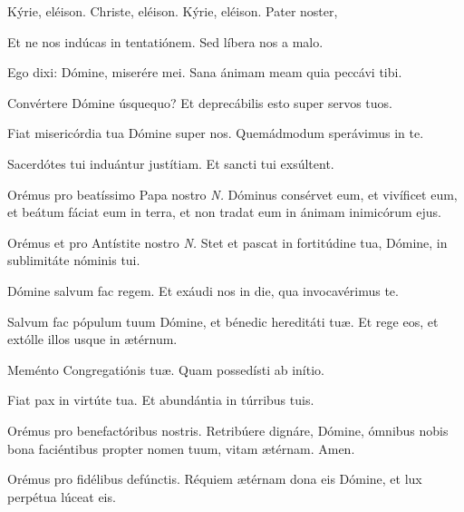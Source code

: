 
\label{preces}Kýrie, eléison. Christe, eléison. Kýrie, eléison. Pater noster, 


\vv Et ne nos indúcas in tentatiónem. \rr Sed líbera nos a malo.

\vv Ego dixi: Dómine, miserére mei. \rr Sana ánimam meam quia peccávi tibi.

\vv Convértere Dómine úsquequo?
\rr Et deprecábilis esto super servos tuos.

\vv Fiat misericórdia tua Dómine super nos.
\rr Quemádmodum sperávimus in te.

\vv Sacerdótes tui induántur justítiam.
\rr Et sancti tui exsúltent.

\vv Orémus pro beatíssimo Papa nostro \textit{N.}
\rr Dóminus consérvet eum, et vivíficet eum, et beátum fáciat eum in terra, et non tradat eum in ánimam inimicórum ejus.

\vv Orémus et pro Antístite nostro \textit{N.}
\rr Stet et pascat in fortitúdine tua, Dómine, in sublimitáte nóminis tui.


\vv Dómine salvum fac regem.
\rr Et exáudi nos in die, qua invocavérimus te.

\vv Salvum fac pópulum tuum Dómine, et bénedic hereditáti tuæ.
\rr Et rege eos, et extólle illos usque in ætérnum.

\vv Meménto Congregatiónis tuæ.
\rr Quam possedísti ab inítio.

\vv Fiat pax in virtúte tua.
\rr Et abundántia in túrribus tuis.

\vv Orémus pro benefactóribus nostris.
\rr Retribúere dignáre, Dómine, ómnibus nobis bona faciéntibus propter nomen tuum, vitam ætérnam. Amen.

\vv Orémus pro fidélibus defúnctis.
\rr Réquiem ætérnam dona eis Dómine, et lux perpétua lúceat eis.

